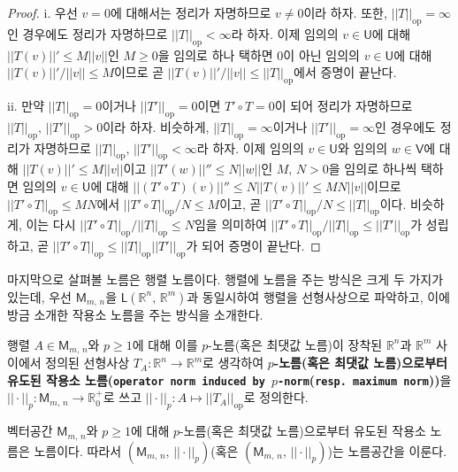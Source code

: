 \begin{proof}
    i. 우선 $v=0$에 대해서는 정리가 자명하므로 $v\ne0$이라 하자. 또한, $||T||_\mathrm{op}=\infty$인 경우에도 정리가 자명하므로 $||T||_\mathrm{op}<\infty$라 하자. 이제 임의의 $v\in\mathsf{U}$에 대해 $||T(v)||'\leq M||v||$인 $M\geq0$을 임의로 하나 택하면 $0$이 아닌 임의의 $v\in\mathsf{U}$에 대해 $||T(v)||'/||v||\leq M$이므로 곧 $||T(v)||'/||v||\leq||T||_\mathrm{op}$에서 증명이 끝난다.

    ii. 만약 $||T||_\mathrm{op}=0$이거나 $||T'||_\mathrm{op}=0$이면 $T'\circ T=0$이 되어 정리가 자명하므로 $||T||_\mathrm{op},\,||T'||_\mathrm{op}>0$이라 하자. 비슷하게, $||T||_\mathrm{op}=\infty$이거나 $||T'||_\mathrm{op}=\infty$인 경우에도 정리가 자명하므로 $||T||_\mathrm{op},\,||T'||_\mathrm{op}<\infty$라 하자. 이제 임의의 $v\in\mathsf{U}$와 임의의 $w\in\mathsf{V}$에 대해 $||T(v)||'\leq M||v||$이고 $||T'(w)||''\leq N||w||$인 $M,\,N>0$을 임의로 하나씩 택하면 임의의 $v\in\mathsf{U}$에 대해 $||(T'\circ T)(v)||''\leq N||T(v)||'\leq MN||v||$이므로 $||T'\circ T||_\mathrm{op}\leq MN$에서 $||T'\circ T||_\mathrm{op}/N\leq M$이고, 곧 $||T'\circ T||_\mathrm{op}/N\leq||T||_\mathrm{op}$이다. 비슷하게, 이는 다시 $||T'\circ T||_\mathrm{op}/||T||_\mathrm{op}\leq N$임을 의미하여 $||T'\circ T||_\mathrm{op}/||T||_\mathrm{op}\leq||T'||_\mathrm{op}$가 성립하고, 곧 $||T'\circ T||_\mathrm{op}\leq||T||_\mathrm{op}||T'||_\mathrm{op}$가 되어 증명이 끝난다.
\end{proof}

마지막으로 살펴볼 노름은 행렬 노름이다. 행렬에 노름을 주는 방식은 크게 두 가지가 있는데, 우선 $\mathsf{M}_{m,\,n}$을 $\mathsf{L}(\mathbb{R}^n,\,\mathbb{R}^m)$과 동일시하여 행렬을 선형사상으로 파악하고, 이에 방금 소개한 작용소 노름을 주는 방식을 소개한다.

\begin{definition}
    행렬 $A\in\mathsf{M}_{m,\,n}$와 $p\geq1$에 대해 이를 $p$-노름(혹은 최댓값 노름)이 장착된 $\mathbb{R}^n$과 $\mathbb{R}^m$ 사이에서 정의된 선형사상 $T_A:\mathbb{R}^n\to\mathbb{R}^m$로 생각하여 \textbf{$p$-노름(혹은 최댓값 노름)으로부터 유도된 작용소 노름(\texttt{operator norm induced by $p$-norm}(\texttt{resp. maximum norm}))}을 $||\cdot||_p:\mathsf{M}_{m,\,n}\to\mathbb{R}_0^+$로 쓰고 $||\cdot||_p:A\mapsto||T_A||_\mathrm{op}$로 정의한다.
\end{definition}

\begin{proposition}
    벡터공간 $\mathsf{M}_{m,\,n}$와 $p\geq1$에 대해 $p$-노름(혹은 최댓값 노름)으로부터 유도된 작용소 노름은 노름이다. 따라서 $(\mathsf{M}_{m,\,n},\,||\cdot||_p)$(혹은 $(\mathsf{M}_{m,\,n},\,||\cdot||_p)$)는 노름공간을 이룬다.
\end{proposition}

